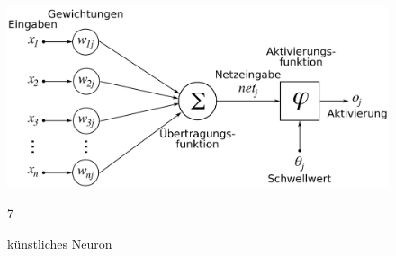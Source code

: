 \documentclass{llncs}
\begin{document}
\begin{figure}[htbp]
	\centering
	\includegraphics[width=1.0\textwidth]{Neuron.png}
	\caption{künstliches Neuron}7
	\label{fig:Bild1}
\end{figure}
\end{document}
